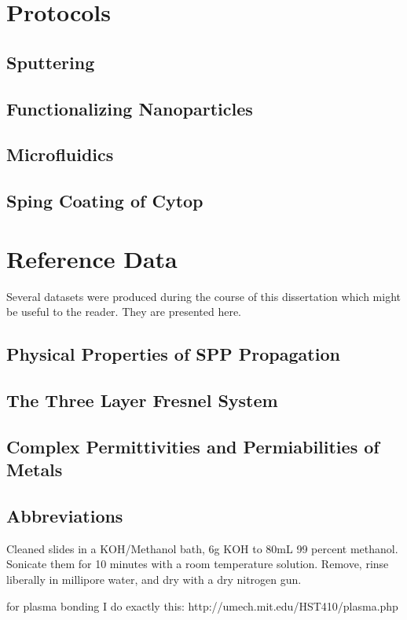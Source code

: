 \documentclass[a4paper,titlepage,onecolumn]{report}
\begin{document}
\chapter{Protocols}
\section{Sputtering}
\section{Functionalizing Nanoparticles}
\section{Microfluidics}
\section{Sping Coating of Cytop}

\chapter{Reference Data}
Several datasets were produced during the course of this dissertation which
might be useful to the reader.  They are presented here.
\section{Physical Properties of SPP Propagation}
\label{ref:physicalproperties}
\section{The Three Layer Fresnel System}

\section{Complex Permittivities and Permiabilities of Metals}


\section{Abbreviations}

Cleaned slides in a KOH/Methanol bath, 6g KOH to 80mL 99 percent methanol.
Sonicate them for 10 minutes with a room temperature solution.  Remove,
rinse liberally in millipore water, and dry with a dry nitrogen gun.

for plasma bonding I do exactly this:
http://umech.mit.edu/HST410/plasma.php






\end{document}
